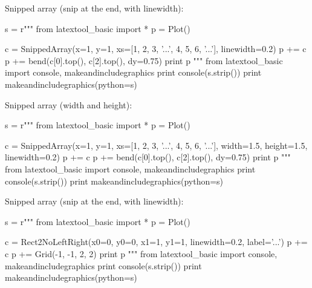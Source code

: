\begin{samepage}
Snipped array (snip at the end, with linewidth):
\begin{python}
s = r"""
from latextool_basic import *
p = Plot()

c = SnippedArray(x=1, y=1, xs=[1, 2, 3, '...', 4, 5, 6, '...'], linewidth=0.2)
p += c
p += bend(c[0].top(), c[2].top(), dy=0.75)
print p
"""
from latextool_basic import console, makeandincludegraphics
print console(s.strip())
print makeandincludegraphics(python=s)
\end{python}
\end{samepage}

\begin{samepage}
Snipped array (width and height):
\begin{python}
s = r"""
from latextool_basic import *
p = Plot()

c = SnippedArray(x=1, y=1, xs=[1, 2, 3, '...', 4, 5, 6, '...'], 
    width=1.5, height=1.5, linewidth=0.2)
p += c
p += bend(c[0].top(), c[2].top(), dy=0.75)
print p
"""
from latextool_basic import console, makeandincludegraphics
print console(s.strip())
print makeandincludegraphics(python=s)
\end{python}
\end{samepage}



\begin{samepage}
Snipped array (snip at the end, with linewidth):
\begin{python}
s = r"""
from latextool_basic import *
p = Plot()

c = Rect2NoLeftRight(x0=0, y0=0, x1=1, y1=1, linewidth=0.2, label='...')
p += c
p += Grid(-1, -1, 2, 2)
print p
"""
from latextool_basic import console, makeandincludegraphics
print console(s.strip())
print makeandincludegraphics(python=s)
\end{python}
\end{samepage}

